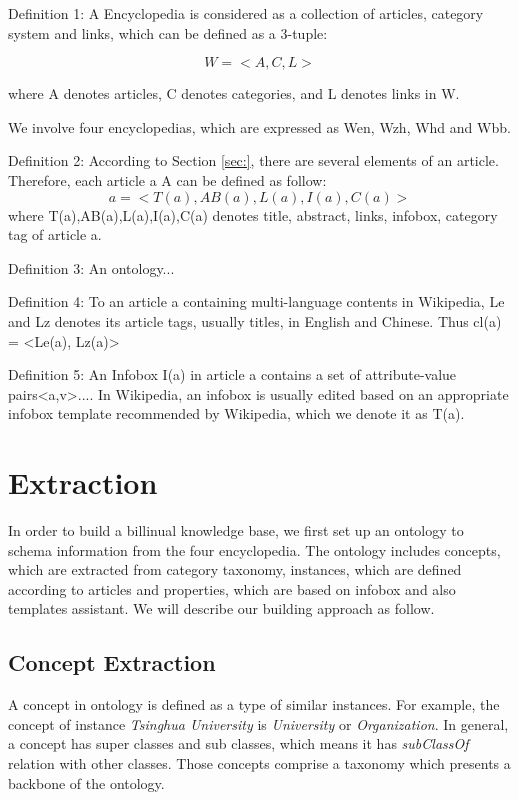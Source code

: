 \documentclass[runningheads,a4paper]{llncs}
\begin{document}
Definition 1: A Encyclopedia is considered as a collection of articles, category system and links, which can be defined as a 3-tuple:

\begin{equation}
W = <A,C,L>
\end{equation} 

where A denotes articles, C denotes categories, and L denotes links in W.

We involve four encyclopedias, which are expressed as Wen, Wzh, Whd and Wbb.

Definition 2: According to Section \ref {sec:}, there are several elements of an article. Therefore, each article a A can be defined as follow:
\begin{equation}
    a = <T(a),AB(a),L(a),I(a),C(a)>
\end{equation}
where T(a),AB(a),L(a),I(a),C(a) denotes title, abstract, links, infobox, category tag of article a.

Definition 3:  An ontology...

Definition 4: To an article a containing multi-language contents in Wikipedia, Le and Lz denotes its article tags, usually titles, in English and Chinese. Thus cl(a) = <Le(a), Lz(a)>

Definition 5: An Infobox I(a) in article a contains a set of attribute-value pairs{<a,v>...}. In Wikipedia, an infobox is usually edited based on an appropriate infobox template recommended by Wikipedia, which we denote it as T(a).

\section{Extraction}
\label{sec:extraction}
In order to build a billinual knowledge base, we first set up an ontology to schema information from the four encyclopedia. The ontology includes concepts, which are extracted from category taxonomy, instances, which are defined according to articles and properties, which are based on infobox and also templates assistant. We will describe our building approach as follow.
\subsection{Concept Extraction}
\label{sec:ce}
A concept in ontology is defined as a type of similar instances. For example, the concept of instance \emph{Tsinghua University} is \emph{University} or \emph{Organization}. In general, a concept has super classes and sub classes, which means it has \emph{subClassOf} relation with other classes. Those concepts comprise a taxonomy which presents a backbone of the ontology.
\end{document}
